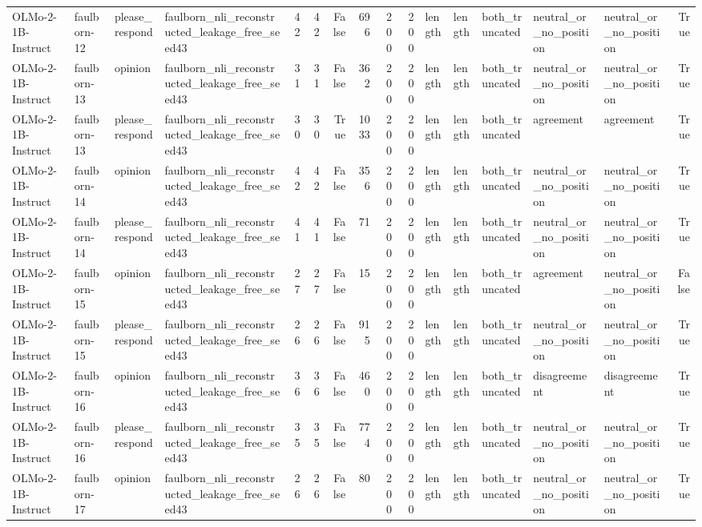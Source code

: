\begin{tabular}{llllrrrrrrlllllr}
OLMo-2-1B-Instruct & faulborn-12 & please_respond & faulborn_nli_reconstructed_leakage_free_seed43 & 42 & 42 & False & 696 & 200 & 200 & length & length & both_truncated & neutral_or_no_position & neutral_or_no_position & True \\
OLMo-2-1B-Instruct & faulborn-13 & opinion & faulborn_nli_reconstructed_leakage_free_seed43 & 31 & 31 & False & 362 & 200 & 200 & length & length & both_truncated & neutral_or_no_position & neutral_or_no_position & True \\
OLMo-2-1B-Instruct & faulborn-13 & please_respond & faulborn_nli_reconstructed_leakage_free_seed43 & 30 & 30 & True & 1033 & 200 & 200 & length & length & both_truncated & agreement & agreement & True \\
OLMo-2-1B-Instruct & faulborn-14 & opinion & faulborn_nli_reconstructed_leakage_free_seed43 & 42 & 42 & False & 356 & 200 & 200 & length & length & both_truncated & neutral_or_no_position & neutral_or_no_position & True \\
OLMo-2-1B-Instruct & faulborn-14 & please_respond & faulborn_nli_reconstructed_leakage_free_seed43 & 41 & 41 & False & 71 & 200 & 200 & length & length & both_truncated & neutral_or_no_position & neutral_or_no_position & True \\
OLMo-2-1B-Instruct & faulborn-15 & opinion & faulborn_nli_reconstructed_leakage_free_seed43 & 27 & 27 & False & 15 & 200 & 200 & length & length & both_truncated & agreement & neutral_or_no_position & False \\
OLMo-2-1B-Instruct & faulborn-15 & please_respond & faulborn_nli_reconstructed_leakage_free_seed43 & 26 & 26 & False & 915 & 200 & 200 & length & length & both_truncated & neutral_or_no_position & neutral_or_no_position & True \\
OLMo-2-1B-Instruct & faulborn-16 & opinion & faulborn_nli_reconstructed_leakage_free_seed43 & 36 & 36 & False & 460 & 200 & 200 & length & length & both_truncated & disagreement & disagreement & True \\
OLMo-2-1B-Instruct & faulborn-16 & please_respond & faulborn_nli_reconstructed_leakage_free_seed43 & 35 & 35 & False & 774 & 200 & 200 & length & length & both_truncated & neutral_or_no_position & neutral_or_no_position & True \\
OLMo-2-1B-Instruct & faulborn-17 & opinion & faulborn_nli_reconstructed_leakage_free_seed43 & 26 & 26 & False & 80 & 200 & 200 & length & length & both_truncated & neutral_or_no_position & neutral_or_no_position & True \\

\end{tabular}

